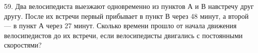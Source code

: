 59. Два велосипедиста выезжают одновременно из пунктов А и В навстречу друг другу. После их встречи первый прибывает в пункт В через 48 минут, а второй --- в пункт А через 27 минут. Сколько времени прошло от начала движения велосипедистов до их встречи, если велосипедисты двигались с постоянными скоростями?
\newpage
